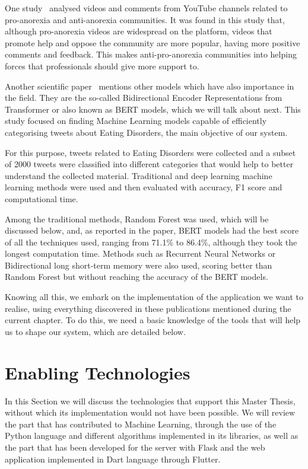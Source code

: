 One study~\cite{oksanen2015pro} analysed videos and comments from YouTube channels related to pro-anorexia and anti-anorexia communities. It was found in this study that, although pro-anorexia videos are widespread on the platform, videos that promote help and oppose the community are more popular, having more positive comments and feedback. This makes anti-pro-anorexia communities into helping forces that professionals should give more support to.

Another scientific paper~\cite{benitez2022traditional} mentions other models which have also importance in the field. They are the so-called Bidirectional Encoder Representations from Transformer or also known as BERT models, which we will talk about next. This study focused on finding Machine Learning models capable of efficiently categorising tweets about Eating Disorders, the main objective of our system.

For this purpose, tweets related to Eating Disorders were collected and a subset of 2000 tweets were classified into different categories that would help to better understand the collected material. Traditional and deep learning machine learning methods were used and then evaluated with accuracy, F1 score and computational time. 

Among the traditional methods, Random Forest was used, which will be discussed below, and, as reported in the paper, BERT models had the best score of all the techniques used, ranging from 71.1\% to 86.4\%, although they took the longest computation time. Methods such as Recurrent Neural Networks or Bidirectional long short-term memory were also used, scoring better than Random Forest but without reaching the accuracy of the BERT models.



Knowing all this, we embark on the implementation of the application we want to realise, using everything discovered in these publications mentioned during the current chapter. To do this, we need a basic knowledge of the tools that will help us to shape our system, which are detailed below. 


\section{Enabling Technologies}
In this Section we will discuss the technologies that support this Master Thesis, without which its implementation would not have been possible. We will review the part that has contributed to Machine Learning, through the use of the Python language and different algorithms implemented in its libraries, as well as the part that has been developed for the server with Flask and the web application implemented in Dart language through Flutter.

